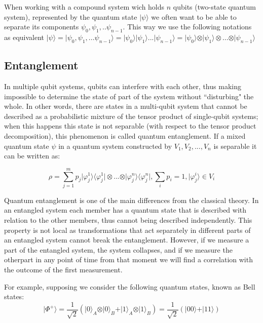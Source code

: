 When working with a compound system wich holds $n$ qubits (two-state quantum system), represented by the quantum state $\vert \psi \rangle$ we often want to be able to separate its components $\psi_{0}, \psi_{1},.. \psi_{n-1}$. This way we use the following notations as equivalent $\vert \psi \rangle = \vert \psi_{0}, \psi_{1}, ... \psi_{n-1} \rangle = \vert \psi_{0}\rangle \vert \psi_{1}\rangle ... \vert \psi_{n-1} \rangle =  \vert \psi_{0}\rangle \otimes \vert \psi_{1}\rangle \otimes ... \otimes \vert \psi_{n-1}\rangle$\cite{Rieffel2011}



\subsection{Entanglement}
\label{subsec:entanglement}

In multiple qubit systems, qubits can interfere with each other, thus making impossible to determine the state of part of the system without ``disturbing" the whole. In other words, there are states in a multi-qubit system that cannot be described as a probabilistic mixture of the tensor product of single-qubit systems; when this happens this state is not separable (with respect to the tensor product decomposition), this phenomenon is called quantum entanglement\cite{Rieffel2011}. If a mixed quantum state $\psi$ in a quantum system constructed by $V_{1}, V_{2}, ..., V_{n}$ is separable it can be written as:


\begin{equation}
\rho= \sum^m_{j=1}{p_{j}\vert\varphi_{j}^{1}\rangle\langle\varphi_{j}^{1}\vert \otimes ... \otimes \vert\varphi_{j}^{n}\rangle\langle\varphi_{j}^{n}\vert}, \sum_{i}{p_{i}}=1, \vert \varphi_{j}^{i} \rangle \in V_{i}
\end{equation}

Quantum entanglement is one of the main differences from the classical theory\cite{Rieffel2011}. In an entangled system each member has a quantum state that is described with relation to the other members, thus cannot being described independently. This property is not local as transformations that act separately in different parts of an entangled system cannot break the entanglement. However, if we measure a part of the entangled system, the system collapses, and if we measure the otherpart in any point of time from that moment we will find a correlation with the outcome of the first measurement.

For example, supposing we consider the following quantum states, known as Bell states:
\begin{equation}
\vert\Phi^{+}\rangle=\frac{1}{\sqrt{2}}(\vert0\rangle_{A} \otimes\vert0\rangle_{B} +\vert1\rangle_{A} \otimes\vert1\rangle_{B})=\frac{1}{\sqrt{2}}(\vert00\rangle+\vert11\rangle)
\end{equation}

